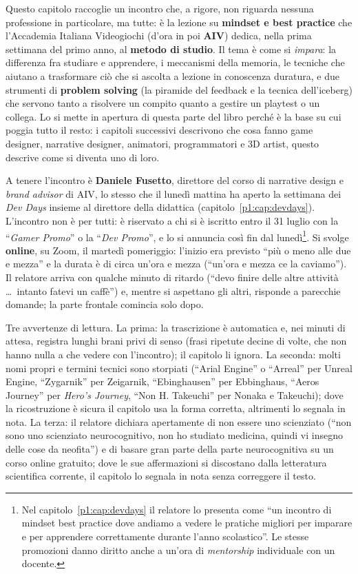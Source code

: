 Questo capitolo raccoglie un incontro che, a rigore, non riguarda nessuna
professione in particolare, ma tutte: è la lezione su \textbf{mindset e best
practice} che l'Accademia Italiana Videogiochi (d'ora in poi \textbf{AIV})
dedica, nella prima settimana del primo anno, al \textbf{metodo di studio}.
Il tema è come si \emph{impara}: la differenza fra studiare e apprendere, i
meccanismi della memoria, le tecniche che aiutano a trasformare ciò che si
ascolta a lezione in conoscenza duratura, e due strumenti di
\textbf{problem solving} (la piramide del feedback e la tecnica
dell'iceberg) che servono tanto a risolvere un compito quanto a gestire un
playtest o un collega. Lo si mette in apertura di questa parte del libro
perché è la base su cui poggia tutto il resto: i capitoli successivi
descrivono che cosa fanno game designer, narrative designer, animatori,
programmatori e 3D artist, questo descrive come si diventa uno di loro.

A tenere l'incontro è \textbf{Daniele Fusetto}, direttore del corso di
narrative design e \emph{brand advisor} di AIV, lo stesso che il lunedì
mattina ha aperto la settimana dei \emph{Dev Days} insieme al direttore
della didattica (capitolo~\ref{p1:cap:devdays}). L'incontro non è per
tutti: è riservato a chi si è iscritto entro il 31 luglio con la
``\emph{Gamer Promo}'' o la ``\emph{Dev Promo}'', e lo si annuncia così fin
dal lunedì\footnote{Nel capitolo~\ref{p1:cap:devdays} il relatore lo
presenta come ``un incontro di mindset best practice dove andiamo a vedere
le pratiche migliori per imparare e per apprendere correttamente durante
l'anno scolastico''. Le stesse promozioni danno diritto anche a un'ora di
\emph{mentorship} individuale con un docente.}. Si svolge \textbf{online},
su Zoom, il martedì pomeriggio: l'inizio era previsto ``più o meno alle due
e mezza'' e la durata è di circa un'ora e mezza (``un'ora e mezza ce la
caviamo''). Il relatore arriva con qualche minuto di ritardo (``devo finire
delle altre attività \ldots\ intanto fatevi un caffè'') e, mentre si
aspettano gli altri, risponde a parecchie domande; la parte frontale
comincia solo dopo.

Tre avvertenze di lettura. La prima: la trascrizione è automatica e, nei
minuti di attesa, registra lunghi brani privi di senso (frasi ripetute
decine di volte, che non hanno nulla a che vedere con l'incontro); il
capitolo li ignora. La seconda: molti nomi propri e termini tecnici sono
storpiati (``Arial Engine'' o ``Arreal'' per Unreal Engine, ``Zygarnik''
per Zeigarnik, ``Ebinghausen'' per Ebbinghaus, ``Aeros Journey'' per
\emph{Hero's Journey}, ``Non H. Takeuchi'' per Nonaka e Takeuchi); dove la
ricostruzione è sicura il capitolo usa la forma corretta, altrimenti lo
segnala in nota. La terza: il relatore dichiara apertamente di non essere
uno scienziato (``non sono uno scienziato neurocognitivo, non ho studiato
medicina, quindi vi insegno delle cose da neofita'') e di basare gran parte
della parte neurocognitiva su un corso online gratuito; dove le sue
affermazioni si discostano dalla letteratura scientifica corrente, il
capitolo lo segnala in nota senza correggere il testo.

